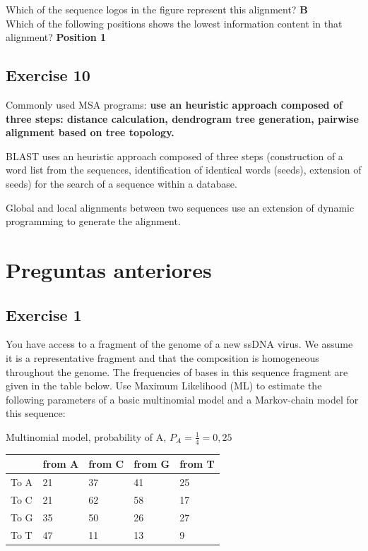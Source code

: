 Which of the sequence logos in the figure represent this alignment? \textbf{B} \\
Which of the following positions shows the lowest information content in that alignment? \textbf{Position 1}

\subsection{Exercise 10}
Commonly used MSA programs: \textbf{use an heuristic approach composed of three steps: distance calculation, dendrogram tree generation, pairwise alignment based on tree topology.}

BLAST uses  an heuristic approach composed of three steps (construction of a word list from the sequences, identification of identical words (seeds), extension of seeds) for the search of a sequence within a database. 

Global and local alignments between two sequences  use an extension of dynamic programming to generate the alignment.

\section{Preguntas anteriores}
\subsection{Exercise 1}
You have access to a fragment of the genome of a new ssDNA virus. We assume it is a representative fragment and that the composition is homogeneous throughout the genome. The frequencies of bases in this sequence fragment are given in the table below. Use Maximum Likelihood (ML) to estimate the following parameters of a basic multinomial model and a Markov-chain model for this sequence:

Multinomial model, probability of A, $P_A = \frac{1}{4} = 0,25 $

\begin{table}[htbp]
\centering
\begin{tabular}{l | l l l l }
& from A & from C & from G & from T \\ \hline
To A & 21 & 37 & 41 & 25 \\
To C & 21 & 62 & 58 & 17 \\
To G & 35 & 50 & 26 & 27 \\
To T & 47 & 11 & 13 & 9
\end{tabular}
\end{table}

